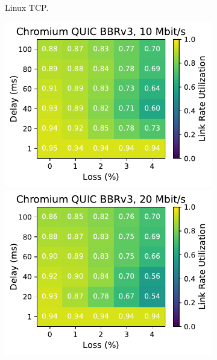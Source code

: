 \begin{figure}[ht]
\begin{subfigure}[b]{0.22\linewidth}
        \caption{Linux TCP.}
    \end{subfigure}
    \begin{subfigure}[b]{0.22\linewidth}
        \includegraphics[width=\linewidth,trim={0 0 2cm 0},clip]{figures/heatmaps/heatmap_quic_bbr3_10mbps.pdf}
        \includegraphics[width=\linewidth,trim={0 0 2cm 0},clip]{figures/heatmaps/heatmap_quic_bbr3_20mbps.pdf}

\end{subfigure}
\end{figure}
